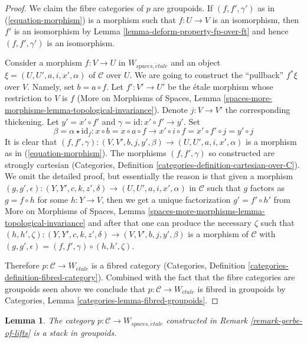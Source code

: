 \documentclass{stacks-project}
\theoremstyle{plain}
\newtheorem{lemma}[subsection]{Lemma}
\theoremstyle{definition}
\theoremstyle{remark}
\numberwithin{equation}{subsection}
\def\etale{{\acute{e}tale}}
\begin{document}
\begin{proof}
We claim the fibre categories of $p$ are groupoids.
If $(f, f', \gamma')$ as in (\ref{equation-morphism})
is a morphism such that $f : U \to V$ is an isomorphism, then
$f'$ is an isomorphism by Lemma \ref{lemma-deform-property-fp-over-ft}
and hence $(f, f', \gamma')$ is an isomorphism.

\medskip\noindent
Consider a morphism $f : V \to U$ in $W_{spaces, \etale}$
and an object $\xi = (U, U', a, i, x', \alpha)$
of $\mathcal{C}$ over $U$. We are going to construct the ``pullback''
$f^*\xi$ over $V$. 
Namely, set $b = a \circ f$. Let $f' : V' \to U'$ be the \'etale morphism
whose restriction to $V$ is $f$ (More on Morphisms of Spaces,
Lemma \ref{spaces-more-morphisms-lemma-topological-invariance}).
Denote $j : V \to V'$ the corresponding thickening.
Let $y' = x' \circ f'$ and $\gamma = \text{id} : x' \circ f' \to y'$.
Set
$$
\beta = \alpha \star \text{id}_f :
x \circ b = x \circ a \circ f \to
x' \circ i \circ f = x' \circ f' \circ j = y' \circ j
$$
It is clear that $(f, f', \gamma) : (V, V', b, j, y', \beta) \to
(U, U', a, i, x', \alpha)$ is a morphism as in
(\ref{equation-morphism}). The morphisms $(f, f', \gamma)$
so constructed are strongly cartesian
(Categories, Definition \ref{categories-definition-cartesian-over-C}).
We omit the detailed proof, but essentially the reason is that
given a morphism
$(g, g', \epsilon) : (Y, Y', c, k, z', \delta) \to (U, U', a, i, x', \alpha)$
in $\mathcal{C}$ such that $g$ factors as $g = f \circ h$ for some
$h : Y \to V$, then we get a unique factorization $g' = f' \circ h'$
from More on Morphisms of Spaces,
Lemma \ref{spaces-more-morphisms-lemma-topological-invariance}
and after that one can produce the necessary $\zeta$ such that
$(h, h', \zeta) :  (Y, Y', c, k, z', \delta) \to
(V, V', b, j, y', \beta)$ is a morphism of $\mathcal{C}$
with $(g, g', \epsilon) = (f, f', \gamma) \circ (h, h', \zeta)$.

\medskip\noindent
Therefore $p : \mathcal{C} \to W_\etale$ is a fibred
category (Categories, Definition \ref{categories-definition-fibred-category}).
Combined with the fact that the fibre categories are groupoids
seen above we conclude that $p : \mathcal{C} \to W_\etale$
is fibred in groupoids by Categories, Lemma
\ref{categories-lemma-fibred-groupoids}.
\end{proof}

\begin{lemma}
\label{lemma-gerbe-of-lifts-stack}
The category $p : \mathcal{C} \to W_{spaces, \etale}$ constructed
in Remark \ref{remark-gerbe-of-lifts} is a stack in groupoids.
\end{lemma}
\end{document}
